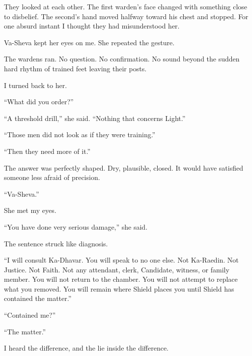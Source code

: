 They looked at each other. The first warden's face changed with something close to disbelief. The second's hand moved halfway toward his chest and stopped. For one absurd instant I thought they had misunderstood her.\par

Va-Sheva kept her eyes on me. She repeated the gesture.\par

The wardens ran. No question. No confirmation. No sound beyond the sudden hard rhythm of trained feet leaving their posts.\par

I turned back to her.\par

``What did you order?''\par

``A threshold drill,'' she said. ``Nothing that concerns Light.''\par

``Those men did not look as if they were training.''\par

``Then they need more of it.''\par

The answer was perfectly shaped. Dry, plausible, closed. It would have satisfied someone less afraid of precision.\par

``Va-Sheva.''\par

She met my eyes.\par

``You have done very serious damage,'' she said.\par

The sentence struck like diagnosis.\par

``I will consult Ka-Dhavar. You will speak to no one else. Not Ka-Raedin. Not Justice. Not Faith. Not any attendant, clerk, Candidate, witness, or family member. You will not return to the chamber. You will not attempt to replace what you removed. You will remain where Shield places you until Shield has contained the matter.''\par

``Contained me?''\par

``The matter.''\par

I heard the difference, and the lie inside the difference.\par

